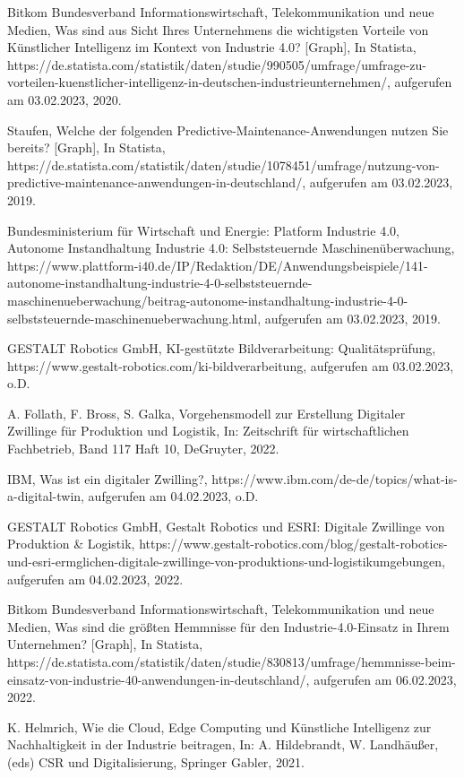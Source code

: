 \begin{thebibliography}{99}
	Bitkom Bundesverband Informationswirtschaft, Telekommunikation und neue Medien,
	Was sind aus Sicht Ihres Unternehmens die wichtigsten Vorteile von Künstlicher Intelligenz im Kontext von Industrie 4.0? [Graph],
	In Statista,
	https://de.statista.com/statistik/daten/studie/990505/umfrage/umfrage-zu-vorteilen-kuenstlicher-intelligenz-in-deutschen-industrieunternehmen/,
	aufgerufen am 03.02.2023,
	2020.

	Staufen,
	Welche der folgenden Predictive-Maintenance-Anwendungen nutzen Sie bereits? [Graph],
	In Statista,
	https://de.statista.com/statistik/daten/studie/1078451/umfrage/nutzung-von-predictive-maintenance-anwendungen-in-deutschland/,
	aufgerufen am 03.02.2023,
	2019.

	Bundesministerium für Wirtschaft und Energie: Platform Industrie 4.0,
	Autonome Instandhaltung Industrie 4.0: Selbststeuernde Maschinenüberwachung,
	https://www.plattform-i40.de/IP/Redaktion/DE/Anwendungsbeispiele/141-autonome-instandhaltung-industrie-4-0-selbststeuernde-maschinenueberwachung/beitrag-autonome-instandhaltung-industrie-4-0-selbststeuernde-maschinenueberwachung.html,
	aufgerufen am 03.02.2023,
	2019.

	GESTALT Robotics GmbH,
	KI-gestützte Bildverarbeitung: Qualitätsprüfung, 
	https://www.gestalt-robotics.com/ki-bildverarbeitung, 
	aufgerufen am 03.02.2023,
	o.D.

	A. Follath, F. Bross, S. Galka,	
	Vorgehensmodell zur Erstellung Digitaler Zwillinge für Produktion und Logistik,
	In: Zeitschrift für wirtschaftlichen Fachbetrieb, Band 117 Haft 10,
	DeGruyter,
	2022.

	IBM,
	Was ist ein digitaler Zwilling?,
	https://www.ibm.com/de-de/topics/what-is-a-digital-twin,
	aufgerufen am 04.02.2023,
	o.D.

	GESTALT Robotics GmbH,
	Gestalt Robotics und ESRI: Digitale Zwillinge von Produktion \& Logistik, 
	https://www.gestalt-robotics.com/blog/gestalt-robotics-und-esri-ermglichen-digitale-zwillinge-von-produktions-und-logistikumgebungen,
	aufgerufen am 04.02.2023,
	2022.

	Bitkom Bundesverband Informationswirtschaft, Telekommunikation und neue Medien,
	Was sind die größten Hemmnisse für den Industrie-4.0-Einsatz in Ihrem Unternehmen? [Graph],
	In Statista,
	https://de.statista.com/statistik/daten/studie/830813/umfrage/hemmnisse-beim-einsatz-von-industrie-40-anwendungen-in-deutschland/,
	aufgerufen am 06.02.2023,
	2022.

	K. Helmrich,
	Wie die Cloud, Edge Computing und Künstliche Intelligenz zur Nachhaltigkeit in der Industrie beitragen, 
	In: A. Hildebrandt, W. Landhäußer, (eds) CSR und Digitalisierung,
	Springer Gabler,
	2021.

\end{thebibliography}
